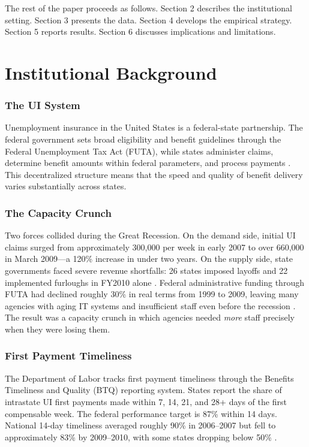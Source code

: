 \documentclass[12pt]{article}
\begin{document}
The rest of the paper proceeds as follows. Section 2 describes the institutional setting. Section 3 presents the data. Section 4 develops the empirical strategy. Section 5 reports results. Section 6 discusses implications and limitations.

\section{Institutional Background}

\subsubsection*{The UI System} Unemployment insurance in the United States is a federal-state partnership. The federal government sets broad eligibility and benefit guidelines through the Federal Unemployment Tax Act (FUTA), while states administer claims, determine benefit amounts within federal parameters, and process payments \citep{wandner2010}. This decentralized structure means that the speed and quality of benefit delivery varies substantially across states.

\subsubsection*{The Capacity Crunch} Two forces collided during the Great Recession. On the demand side, initial UI claims surged from approximately 300,000 per week in early 2007 to over 660,000 in March 2009---a 120\% increase in under two years. On the supply side, state governments faced severe revenue shortfalls: 26 states imposed layoffs and 22 implemented furloughs in FY2010 alone \citep{gao2012}. Federal administrative funding through FUTA had declined roughly 30\% in real terms from 1999 to 2009, leaving many agencies with aging IT systems and insufficient staff even before the recession \citep{oig2012}. The result was a capacity crunch in which agencies needed \emph{more} staff precisely when they were losing them.

\subsubsection*{First Payment Timeliness} The Department of Labor tracks first payment timeliness through the Benefits Timeliness and Quality (BTQ) reporting system. States report the share of intrastate UI first payments made within 7, 14, 21, and 28+ days of the first compensable week. The federal performance target is 87\% within 14 days. National 14-day timeliness averaged roughly 90\% in 2006--2007 but fell to approximately 83\% by 2009--2010, with some states dropping below 50\% \citep{oig2012}.
\end{document}
